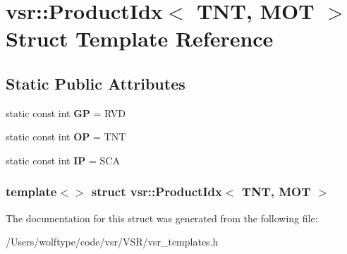 \hypertarget{structvsr_1_1_product_idx_3_01_t_n_t_00_01_m_o_t_01_4}{\section{vsr\-:\-:Product\-Idx$<$ T\-N\-T, M\-O\-T $>$ Struct Template Reference}
\label{structvsr_1_1_product_idx_3_01_t_n_t_00_01_m_o_t_01_4}
}
\subsection*{Static Public Attributes}
\begin{DoxyCompactItemize}
\item 
\hypertarget{structvsr_1_1_product_idx_3_01_t_n_t_00_01_m_o_t_01_4_a33ec99a9d760b315047ee52260361695}{static const int {\bfseries G\-P} = R\-V\-D}\label{structvsr_1_1_product_idx_3_01_t_n_t_00_01_m_o_t_01_4_a33ec99a9d760b315047ee52260361695}

\item 
\hypertarget{structvsr_1_1_product_idx_3_01_t_n_t_00_01_m_o_t_01_4_ad79d43c04a8cf793452758191d072e97}{static const int {\bfseries O\-P} = T\-N\-T}\label{structvsr_1_1_product_idx_3_01_t_n_t_00_01_m_o_t_01_4_ad79d43c04a8cf793452758191d072e97}

\item 
\hypertarget{structvsr_1_1_product_idx_3_01_t_n_t_00_01_m_o_t_01_4_a079b2640dff0ccc40817af51331bbb56}{static const int {\bfseries I\-P} = S\-C\-A}\label{structvsr_1_1_product_idx_3_01_t_n_t_00_01_m_o_t_01_4_a079b2640dff0ccc40817af51331bbb56}

\end{DoxyCompactItemize}
\subsubsection*{template$<$$>$ struct vsr\-::\-Product\-Idx$<$ T\-N\-T, M\-O\-T $>$}



The documentation for this struct was generated from the following file\-:\begin{DoxyCompactItemize}
\item 
/\-Users/wolftype/code/vsr/\-V\-S\-R/vsr\-\_\-templates.\-h\end{DoxyCompactItemize}
